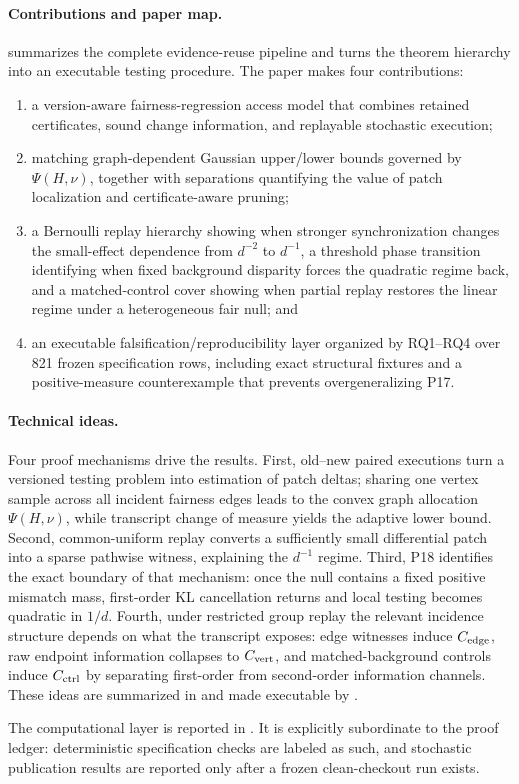 \paragraph{Contributions and paper map.}
 summarizes the complete evidence-reuse pipeline and
 turns the theorem hierarchy into an executable testing
procedure. The paper makes four contributions:
\begin{enumerate}[leftmargin=1.6em,itemsep=2pt]
\item a version-aware fairness-regression access model that combines retained
certificates, sound change information, and replayable stochastic execution;
\item matching graph-dependent Gaussian upper/lower bounds governed by
$\Psi(H,\nu)$, together with separations quantifying the value of patch
localization and certificate-aware pruning;
\item a Bernoulli replay hierarchy showing when stronger synchronization changes
the small-effect dependence from $d^{-2}$ to $d^{-1}$, a threshold phase
transition identifying when fixed background disparity forces the quadratic
regime back, and a matched-control cover showing when partial replay restores
the linear regime under a heterogeneous fair null; and
\item an executable falsification/reproducibility layer organized by RQ1--RQ4
over 821 frozen specification rows, including exact structural fixtures and a
positive-measure counterexample that prevents overgeneralizing P17.
\end{enumerate}
\paragraph{Technical ideas.}
Four proof mechanisms drive the results.  First, old--new paired executions turn
a versioned testing problem into estimation of patch deltas; sharing one vertex
sample across all incident fairness edges leads to the convex graph allocation
$\Psi(H,\nu)$, while transcript change of measure yields the adaptive lower
bound.  Second, common-uniform replay converts a sufficiently small differential
patch into a sparse pathwise witness, explaining the $d^{-1}$ regime.  Third,
P18 identifies the exact boundary of that mechanism: once the null contains a
fixed positive mismatch mass, first-order KL cancellation returns and local
testing becomes quadratic in $1/d$.  Fourth, under restricted group replay the relevant incidence structure depends
on what the transcript exposes: edge witnesses induce $C_{\rm edge}$, raw
endpoint information collapses to $C_{\rm vert}$, and matched-background
controls induce $C_{\rm ctrl}$ by separating first-order from second-order
information channels.  These ideas are summarized in
 and made executable by .

The computational layer is reported in . It is explicitly
subordinate to the proof ledger: deterministic specification checks are labeled
as such, and stochastic publication results are reported only after a frozen
clean-checkout run exists.
